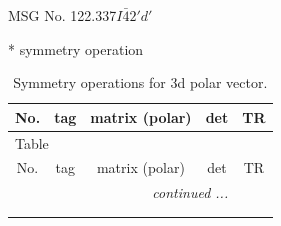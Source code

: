 \documentclass[fleqn,8pt]{jsarticle}
\begin{document}
\setcounter{MaxMatrixCols}{32}

\renewcommand{\tablename}{Table~}
\renewcommand{\figurename}{Figure~}
\begin{center}
\LARGE
MSG No. 122.337\quad$I\bar{4}2'd'$
\end{center}
* symmetry operation
\renewcommand{\arraystretch}{1.3}
\begin{longtable}{ccccc}
\caption{Symmetry operations for 3d polar vector.}
 \\
 \hline \hline
No. & tag & matrix (polar) & det & TR \\ \hline \endfirsthead

\multicolumn{4}{l}{\tablename\ \thetable{}} \\
 \hline \hline
No. & tag & matrix (polar) & det & TR \\ \hline \endhead

 \hline \hline
\multicolumn{4}{r}{\footnotesize\it continued ...} \\ \endfoot

 \hline \hline
\multicolumn{4}{r}{} \\ \endlastfoot


\end{longtable}
\end{document}
